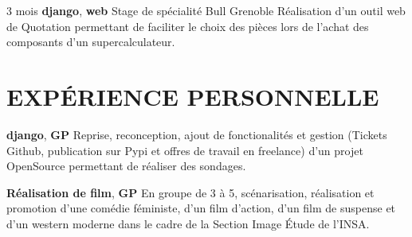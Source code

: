 \documentclass[11pt,a4paper]{moderncv}
\begin{document}

  \cventry
    {3 mois \textbf{django}, \textbf{web}}
    {Stage de spécialité}
    {Bull}
    {Grenoble}
    {}{
      Réalisation d'un outil web de Quotation permettant de faciliter le choix
      des pièces lors de l'achat des composants d'un supercalculateur.
    }





  \section{EXPÉRIENCE PERSONNELLE}

  \cvline
    {\textbf{django}, \textbf{GP}}
    {
      Reprise, reconception, ajout de fonctionalités et gestion (Tickets Github,
      publication sur Pypi et offres de travail en freelance) d'un projet
      OpenSource permettant de réaliser des sondages.
    }{}{}

  \cvline
    {\textbf{Réalisation de film}, \textbf{GP}}
    {
      En groupe de 3 à 5, scénarisation, réalisation et promotion d'une comédie
      féministe, d'un film d'action, d'un film de suspense et d'un western
      moderne dans le cadre de la Section Image Étude de l'INSA.
    }{}{}
\end{document}
